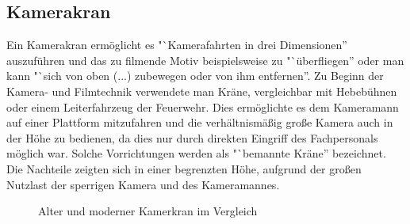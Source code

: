 \documentclass[a4paper, 12pt, bibliography=totocnumbered, listof=numbered]{scrartcl}
\begin{document}
	\subsection{Kamerakran}
	Ein Kamerakran ermöglicht es "`Kamerafahrten in drei Dimensionen”\cite{wikipedia-kamerakran} auszuführen und das zu filmende Motiv beispielsweise zu "`überfliegen”\cite{wikipedia-kamerakran} oder man kann "`sich von oben (...) zubewegen oder von ihm entfernen”\cite{wikipedia-kamerakran}. Zu Beginn der Kamera- und Filmtechnik verwendete man Kräne, vergleichbar mit Hebebühnen oder einem Leiterfahrzeug der Feuerwehr. Dies ermöglichte es dem Kameramann auf einer Plattform mitzufahren und die verhältnismäßig große Kamera auch in der Höhe zu bedienen, da dies nur durch direkten Eingriff des Fachpersonals möglich war. Solche Vorrichtungen werden als "`bemannte Kräne”\cite{wikipedia-kamerakran} bezeichnet. Die Nachteile zeigten sich in einer begrenzten Höhe, aufgrund der großen Nutzlast der sperrigen Kamera und des Kameramannes.

	\begin{figure}[htb]
		\centering
		\hfill
		\caption[Quellen: \newline a) \url{http://www.flickr.com/photos/11695645@N04/2498906266/} \newline b) \url{http://de.wikipedia.org/wiki/Datei:Crane_shot.jpg}]{Alter und moderner Kamerkran im Vergleich}
	\end{figure}
\end{document}
